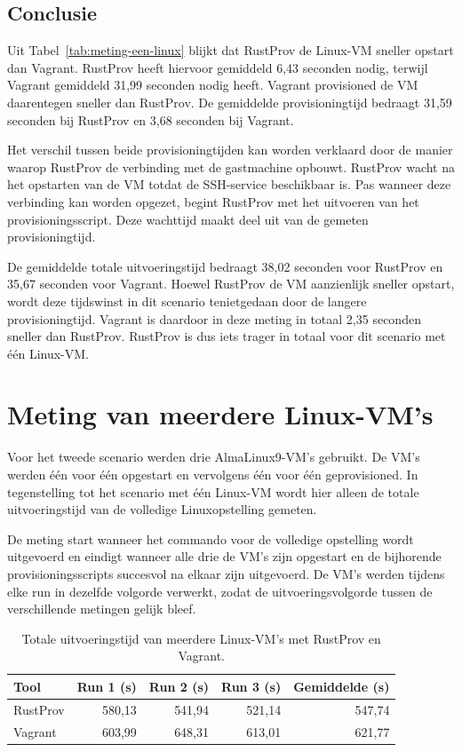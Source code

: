 \subsection{Conclusie}

Uit Tabel~\ref{tab:meting-een-linux} blijkt dat RustProv de Linux-VM sneller opstart dan Vagrant. RustProv heeft hiervoor gemiddeld 6,43 seconden nodig, terwijl Vagrant gemiddeld 31,99 seconden nodig heeft. Vagrant provisioned de VM daarentegen sneller dan RustProv. De gemiddelde provisioningtijd bedraagt 31,59 seconden bij RustProv en 3,68 seconden bij Vagrant.

Het verschil tussen beide provisioningtijden kan worden verklaard door de manier waarop RustProv de verbinding met de gastmachine opbouwt. RustProv wacht na het opstarten van de VM totdat de SSH-service beschikbaar is. Pas wanneer deze verbinding kan worden opgezet, begint RustProv met het uitvoeren van het provisioningsscript. Deze wachttijd maakt deel uit van de gemeten provisioningtijd.

De gemiddelde totale uitvoeringstijd bedraagt 38,02 seconden voor RustProv en 35,67 seconden voor Vagrant. Hoewel RustProv de VM aanzienlijk sneller opstart, wordt deze tijdswinst in dit scenario tenietgedaan door de langere provisioningtijd. Vagrant is daardoor in deze meting in totaal 2,35 seconden sneller dan RustProv. RustProv is dus iets trager in totaal voor dit scenario met één Linux-VM.


\section{Meting van meerdere Linux-VM's}

Voor het tweede scenario werden drie AlmaLinux9-VM's gebruikt. De VM's werden één
voor één opgestart en vervolgens één voor één geprovisioned. In tegenstelling tot
het scenario met één Linux-VM wordt hier alleen de totale uitvoeringstijd van de
volledige Linuxopstelling gemeten.

De meting start wanneer het commando voor de volledige opstelling wordt
uitgevoerd en eindigt wanneer alle drie de VM's zijn opgestart en de bijhorende
provisioningsscripts succesvol na elkaar zijn uitgevoerd. De VM's werden tijdens
elke run in dezelfde volgorde verwerkt, zodat de uitvoeringsvolgorde tussen de
verschillende metingen gelijk bleef.

\begin{table}[htbp]
    \centering
    \caption{Totale uitvoeringstijd van meerdere Linux-VM's met RustProv en Vagrant.}
    \label{tab:meting-meerdere-linux}
    \begin{tabular}{lrrrr}
        \toprule
        \textbf{Tool} &
        \textbf{Run 1 (s)} &
        \textbf{Run 2 (s)} &
        \textbf{Run 3 (s)} &
        \textbf{Gemiddelde (s)} \\
        \midrule
        RustProv & 580,13 & 541,94 & 521,14 & 547,74 \\
        Vagrant  & 603,99 & 648,31 & 613,01 & 621,77 \\
        \bottomrule
    \end{tabular}
\end{table}

